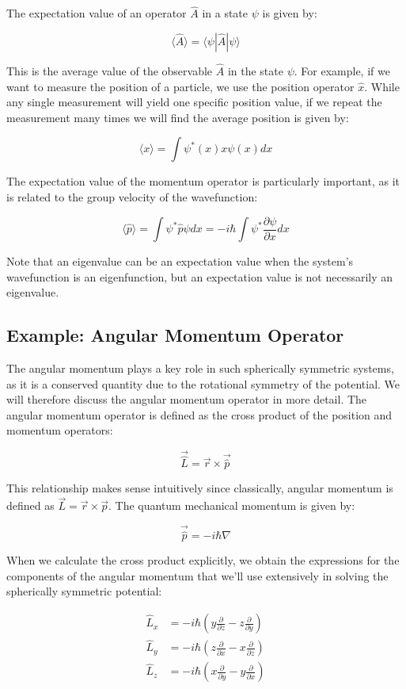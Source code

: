 \documentclass[
  a4paper,
]{book}
\begin{document}
The expectation value of an operator \(\hat{A}\) in a state \(\psi\) is
given by:

\[\langle\hat{A}\rangle = \langle\psi|\hat{A}|\psi\rangle\]

This is the average value of the observable \(\hat{A}\) in the state
\(\psi\). For example, if we want to measure the position of a particle,
we use the position operator \(\hat{x}\). While any single measurement
will yield one specific position value, if we repeat the measurement
many times we will find the average position is given by:

\[\langle x \rangle = \int \psi^*(x) x \psi(x) dx\]

The expectation value of the momentum operator is particularly
important, as it is related to the group velocity of the wavefunction:

\[\langle\hat{p}\rangle = \int\psi^*\hat{p}\psi dx = -i\hbar\int\psi^*\frac{\partial\psi}{\partial x}dx\]

Note that an eigenvalue can be an expectation value when the system's
wavefunction is an eigenfunction, but an expectation value is not
necessarily an eigenvalue.

\subsection{Example: Angular Momentum
Operator}\label{example-angular-momentum-operator}

The angular momentum plays a key role in such spherically symmetric
systems, as it is a conserved quantity due to the rotational symmetry of
the potential. We will therefore discuss the angular momentum operator
in more detail. The angular momentum operator is defined as the cross
product of the position and momentum operators:

\[\vec{\hat{L}} = \vec{r} \times \vec{\hat{p}}\]

This relationship makes sense intuitively since classically, angular
momentum is defined as \(\vec{L} = \vec{r} \times \vec{p}\). The quantum
mechanical momentum is given by:

\[\vec{\hat{p}} = -i\hbar\nabla\]

When we calculate the cross product explicitly, we obtain the
expressions for the components of the angular momentum that we'll use
extensively in solving the spherically symmetric potential:

\[
\begin{aligned}
\hat{L}_x &= -i\hbar\left(y\frac{\partial}{\partial z} - z\frac{\partial}{\partial y}\right) \\
\hat{L}_y &= -i\hbar\left(z\frac{\partial}{\partial x} - x\frac{\partial}{\partial z}\right) \\
\hat{L}_z &= -i\hbar\left(x\frac{\partial}{\partial y} - y\frac{\partial}{\partial x}\right)
\end{aligned}
\]
\end{document}
